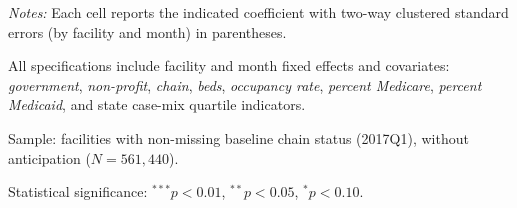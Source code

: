 \documentclass[11pt]{article}
\begin{document}
\begin{table}[!ht]
\begin{threeparttable}
\begin{tablenotes}[flushleft]
\footnotesize
\item \textit{Notes:} Each cell reports the indicated coefficient with two-way clustered standard errors (by facility and month) in parentheses.
\item All specifications include facility and month fixed effects and covariates: \textit{government}, \textit{non-profit}, \textit{chain}, \textit{beds}, \textit{occupancy rate}, \textit{percent Medicare}, \textit{percent Medicaid}, and state case-mix quartile indicators.
\item Sample: facilities with non-missing baseline chain status (2017Q1), without anticipation ($N=561,440$).
\item Statistical significance: $^{***}p<0.01$, $^{**}p<0.05$, $^{*}p<0.10$.
\end{tablenotes}
\end{threeparttable}
\end{table}
\endgroup
\end{document}
